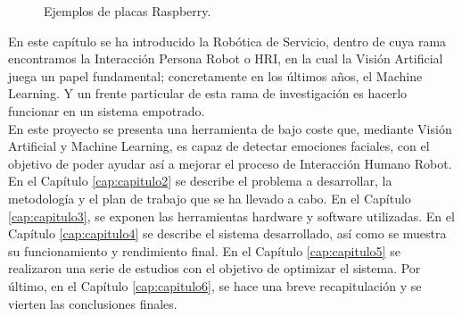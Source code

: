 \begin{figure}[h!]
  \begin{center}
    \subcapcentertrue
    \hspace{1cm}
  \end{center}
\caption{Ejemplos de placas Raspberry.}
\label{fig:raspberry_ejemplos}
\end{figure}

En este capítulo se ha introducido la Robótica de Servicio, dentro de cuya rama encontramos la Interacción Persona Robot o HRI, en la cual la Visión Artificial juega un papel fundamental; concretamente en los últimos años, el Machine Learning. Y un frente particular de esta rama de investigación es hacerlo funcionar en un sistema empotrado.\\

En este proyecto se presenta una herramienta de bajo coste que, mediante Visión Artificial y Machine Learning, es capaz de detectar emociones faciales, con el objetivo de poder ayudar así a mejorar el proceso de Interacción Humano Robot. En el Capítulo \ref{cap:capitulo2} se describe el problema a desarrollar, la metodología y el plan de trabajo que se ha llevado a cabo. En el Capítulo \ref{cap:capitulo3}, se exponen las herramientas hardware y software utilizadas. En el Capítulo \ref{cap:capitulo4} se describe el sistema desarrollado, así como se muestra su funcionamiento y rendimiento final. En el Capítulo \ref{cap:capitulo5} se realizaron una serie de estudios con el objetivo de optimizar el sistema. Por último, en el Capítulo \ref{cap:capitulo6}, se hace una breve recapitulación y se vierten las conclusiones finales.






